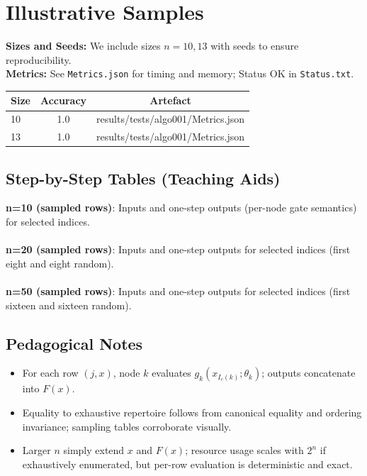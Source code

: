 \documentclass{article}
\begin{document}
\section{Illustrative Samples}
\textbf{Sizes and Seeds:} We include sizes \(n=10,13\) with seeds to ensure reproducibility.\\
\textbf{Metrics:} See \texttt{Metrics.json} for timing and memory; Status OK in \texttt{Status.txt}.\\
\begin{center}
\begin{tabular}{lcc}
\toprule
\textbf{Size} & \textbf{Accuracy} & \textbf{Artefact} \\
\midrule
10 & 1.0 & results/tests/algo001/Metrics.json \\
13 & 1.0 & results/tests/algo001/Metrics.json \\
\bottomrule
\end{tabular}
\end{center}

\subsection*{Step-by-Step Tables (Teaching Aids)}
\textbf{n=10 (sampled rows)}: Inputs and one-step outputs (per-node gate semantics) for selected indices.\\
\\
\textbf{n=20 (sampled rows)}: Inputs and one-step outputs for selected indices (first eight and eight random).\\
\\
\textbf{n=50 (sampled rows)}: Inputs and one-step outputs for selected indices (first sixteen and sixteen random).\\

\subsection*{Pedagogical Notes}
\begin{itemize}
 \item For each row $(j,x)$, node $k$ evaluates $g_k(x_{I_c(k)};\theta_k)$; outputs concatenate into $F(x)$.
 \item Equality to exhaustive repertoire follows from canonical equality and ordering invariance; sampling tables corroborate visually.
 \item Larger $n$ simply extend $x$ and $F(x)$; resource usage scales with $2^n$ if exhaustively enumerated, but per-row evaluation is deterministic and exact.
\end{itemize}
\end{document}
